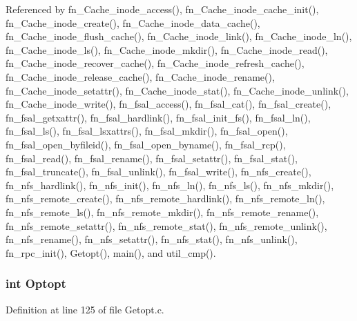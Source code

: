 Referenced by fn\_\-Cache\_\-inode\_\-access(), fn\_\-Cache\_\-inode\_\-cache\_\-init(), fn\_\-Cache\_\-inode\_\-create(), fn\_\-Cache\_\-inode\_\-data\_\-cache(), fn\_\-Cache\_\-inode\_\-flush\_\-cache(), fn\_\-Cache\_\-inode\_\-link(), fn\_\-Cache\_\-inode\_\-ln(), fn\_\-Cache\_\-inode\_\-ls(), fn\_\-Cache\_\-inode\_\-mkdir(), fn\_\-Cache\_\-inode\_\-read(), fn\_\-Cache\_\-inode\_\-recover\_\-cache(), fn\_\-Cache\_\-inode\_\-refresh\_\-cache(), fn\_\-Cache\_\-inode\_\-release\_\-cache(), fn\_\-Cache\_\-inode\_\-rename(), fn\_\-Cache\_\-inode\_\-setattr(), fn\_\-Cache\_\-inode\_\-stat(), fn\_\-Cache\_\-inode\_\-unlink(), fn\_\-Cache\_\-inode\_\-write(), fn\_\-fsal\_\-access(), fn\_\-fsal\_\-cat(), fn\_\-fsal\_\-create(), fn\_\-fsal\_\-getxattr(), fn\_\-fsal\_\-hardlink(), fn\_\-fsal\_\-init\_\-fs(), fn\_\-fsal\_\-ln(), fn\_\-fsal\_\-ls(), fn\_\-fsal\_\-lsxattrs(), fn\_\-fsal\_\-mkdir(), fn\_\-fsal\_\-open(), fn\_\-fsal\_\-open\_\-byfileid(), fn\_\-fsal\_\-open\_\-byname(), fn\_\-fsal\_\-rcp(), fn\_\-fsal\_\-read(), fn\_\-fsal\_\-rename(), fn\_\-fsal\_\-setattr(), fn\_\-fsal\_\-stat(), fn\_\-fsal\_\-truncate(), fn\_\-fsal\_\-unlink(), fn\_\-fsal\_\-write(), fn\_\-nfs\_\-create(), fn\_\-nfs\_\-hardlink(), fn\_\-nfs\_\-init(), fn\_\-nfs\_\-ln(), fn\_\-nfs\_\-ls(), fn\_\-nfs\_\-mkdir(), fn\_\-nfs\_\-remote\_\-create(), fn\_\-nfs\_\-remote\_\-hardlink(), fn\_\-nfs\_\-remote\_\-ln(), fn\_\-nfs\_\-remote\_\-ls(), fn\_\-nfs\_\-remote\_\-mkdir(), fn\_\-nfs\_\-remote\_\-rename(), fn\_\-nfs\_\-remote\_\-setattr(), fn\_\-nfs\_\-remote\_\-stat(), fn\_\-nfs\_\-remote\_\-unlink(), fn\_\-nfs\_\-rename(), fn\_\-nfs\_\-setattr(), fn\_\-nfs\_\-stat(), fn\_\-nfs\_\-unlink(), fn\_\-rpc\_\-init(), Getopt(), main(), and util\_\-cmp().
\subsubsection{\setlength{\rightskip}{0pt plus 5cm}int {\bf Optopt}}\label{Getopt_8c_a5}




Definition at line 125 of file Getopt.c.

